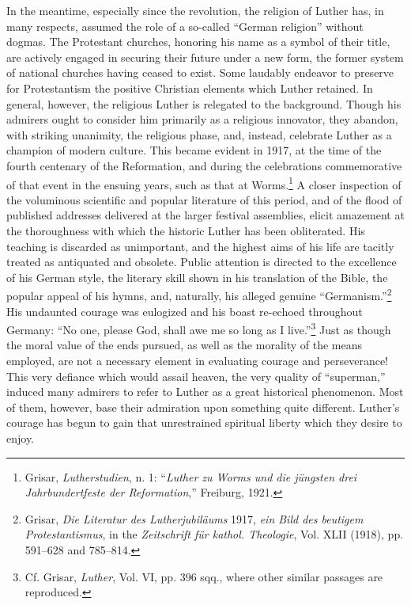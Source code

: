 In the meantime, especially since the revolution, the religion of
Luther has, in many respects, assumed the role of a so-called “German
religion” without dogmas. The Protestant churches, honoring his
name as a symbol of their title, are actively engaged in securing their
future under a new form, the former system of national churches
having ceased to exist. Some laudably endeavor to preserve for Protestantism
the positive Christian elements which Luther retained. In
general, however, the religious Luther is relegated to the background.
Though his admirers ought to consider him primarily as a religious
innovator, they abandon, with striking unanimity, the religious phase,
and, instead, celebrate Luther as a champion of modern culture. This
became evident in 1917, at the time of the fourth centenary of the
Reformation, and during the celebrations commemorative of that
event in the ensuing years, such as that at Worms.\footnote
{Grisar, \textit{Lutherstudien}, n. 1: “\textit{Luther zu Worms und die jüngsten drei Jahrbundertfeste
der Reformation},” Freiburg, 1921.}
A closer inspection
of the voluminous scientific and popular literature of this period, and
of the flood of published addresses delivered at the larger
festival assemblies, elicit amazement at the thoroughness with which
the historic Luther has been obliterated. His teaching is discarded as
unimportant, and the highest aims of his life are tacitly treated as
antiquated and obsolete. Public attention is directed to the excellence
of his German style, the literary skill shown in his translation of the
Bible, the popular appeal of his hymns, and, naturally, his alleged
genuine “Germanism.”\footnote
{Grisar, \textit{Die Literatur des Lutherjubiläums} 1917, \textit{ein Bild des beutigem Protestantismus},
in the \textit{Zeitschrift für kathol. Theologie}, Vol. XLII (1918), pp. 591--628 and 785--814.}
His undaunted courage was eulogized and
his boast re-echoed throughout Germany: “No one, please God, shall
awe me so long as I live.”\footnote{Cf. Grisar, \textit{Luther}, Vol. VI, pp. 396 sqq., where other similar passages are reproduced.}
Just as though the moral value of the
ends pursued, as well as the morality of the means employed, are not
a necessary element in evaluating courage and perseverance! This
very defiance which would assail heaven, the very quality of
“superman,” induced many admirers to refer to Luther as a great
historical phenomenon. Most of them, however, base their admiration upon
something quite different. Luther’s courage has begun to
gain that unrestrained spiritual liberty which they desire to enjoy.
